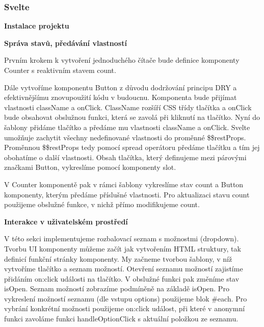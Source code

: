 \subsubsection{Svelte}

\begin{flushleft}
  \textbf{Instalace projektu}
\end{flushleft}

\begin{flushleft}
  \textbf{Správa stavů, předávání vlastností}
\end{flushleft}

Prvním krokem k vytvoření jednoduchého čítače bude definice komponenty Counter s reaktivním stavem count.

Dále vytvoříme komponentu Button z důvodu dodržování principu DRY a efektivnějšímu znovupoužití kódu v budoucnu.
Komponenta bude přijímat vlastnosti className a onClick. ClassName rozšíří CSS třídy tlačítka a onClick bude obsahovat obslužnou funkci, která se zavolá při kliknutí na tlačítko.
Nyní do šablony přidáme tlačítko a předáme mu vlastnosti className a onClick.
Svelte umožňuje zachytit všechny nedefinované vlastnosti do proměnné \$\$restProps. Proměnnou \$\$restProps tedy pomocí spread operátoru předáme tlačítku a tím jej obohatíme o další vlastnosti. 
Obsah tlačítka, který definujeme mezi párovými značkami Button, vykreslíme pomocí komponenty slot.

V Counter komponentě pak v rámci šablony vykreslíme stav count a Button komponenty, kterým předáme příslušné vlastnosti. 
Pro aktualizaci stavu count použijeme obslužné funkce, v nichž přímo modifikujeme count.

\begin{flushleft}
  \textbf{Interakce v uživatelském prostředí}
\end{flushleft}

V této sekci implementujeme rozbalovací seznam s možnostmi (dropdown). Tvorbu UI komponenty můžeme začít jak vytvořením HTML struktury, tak definicí funkční stránky komponenty. 
My začneme tvorbou šablony, v níž vytvoříme tlačítko a seznam možností. Otevření seznamu možností zajistíme přidáním on:click události na tlačítko. V obslužné funkci pak změníme stav isOpen. 
Seznam možností zobrazíme podmíněně na základě isOpen. Pro vykreslení možností seznamu (dle vstupu options) použijeme blok \#each. 
Pro vybrání konkrétní možnosti použijeme on:click událost, při které v anonymní funkci zavoláme funkci handleOptionClick s aktuální položkou ze seznamu.

